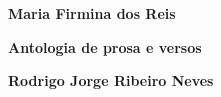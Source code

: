 \textbf{Maria Firmina dos Reis} \lipsum[1]

\textbf{Antologia de prosa e versos} \lipsum[2]

\textbf{Rodrigo Jorge Ribeiro Neves} \lipsum[3]







